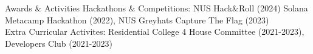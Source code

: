 \documentclass{resume} %
\begin{document}

\begin{rSection}{Awards \& Activities}
Hackathons \& Competitions: \textnormal{NUS Hack\&Roll (2024) Solana Metacamp Hackathon (2022), NUS Greyhats Capture The Flag (2023)} \\
Extra Curricular Activites: \textnormal{Residential College 4 House Committee (2021-2023), Developers Club (2021-2023)}
\end{rSection}

\end{document}
